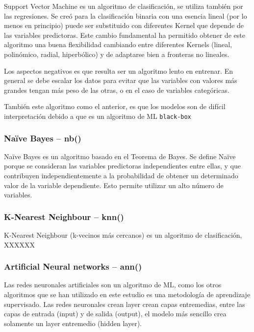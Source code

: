 \documentclass[
]{article}
\begin{document}
Support Vector Machine es un algoritmo de clasificación, se utiliza
también por las regresiones. Se creó para la clasificación binaria con
una esencia lineal (por lo menos en principio) puede ser substituido con
diferentes Kernel que depende de las variables predictoras. Este cambio
fundamental ha permitido obtener de este algoritmo una buena
flexibilidad cambiando entre diferentes Kernels (lineal, polinómico,
radial, hiperbólico) y de adaptarse bien a fronteras no lineales.

Los aspectos negativos es que resulta ser un algoritmo lento en
entrenar. En general se debe escalar los datos para evitar que las
variables con valores más grandes tengan más peso de las otras, o en el
caso de variables categóricas.

También este algoritmo como el anterior, es que los modelos son de
difícil interpretación debido a que es un algoritmo de ML
\texttt{black-box}

\hypertarget{nauxefve-bayes-nb}{%
\subsubsection{Naïve Bayes -- nb()}\label{nauxefve-bayes-nb}}

Naïve Bayes es un algoritmo basado en el Teorema de Bayes. Se define
Naïve porque se consideran las variables predictoras independientes
entre ellas, y que contribuyen independientemente a la probabilidad de
obtener un determinado valor de la variable dependiente. Esto permite
utilizar un alto número de variables.

\hypertarget{k-nearest-neighbour-knn}{%
\subsubsection{K-Nearest Neighbour --
knn()}\label{k-nearest-neighbour-knn}}

K-Nearest Neighbour (k-vecinos más cercanos) es un algoritmo de
clasificación, XXXXXX

\hypertarget{artificial-neural-networks-ann}{%
\subsubsection{Artificial Neural networks --
ann()}\label{artificial-neural-networks-ann}}

Las redes neuronales artificiales son un algoritmo de ML, como los otros
algoritmos que se han utilizado en este estudio es una metodología de
aprendizaje supervisado. Las redes neuronales crean layer crean capas
entremedias, entre las capas de entrada (input) y de salida (output), el
modelo más sencillo crea solamente un layer entremedio (hidden layer).
\end{document}

